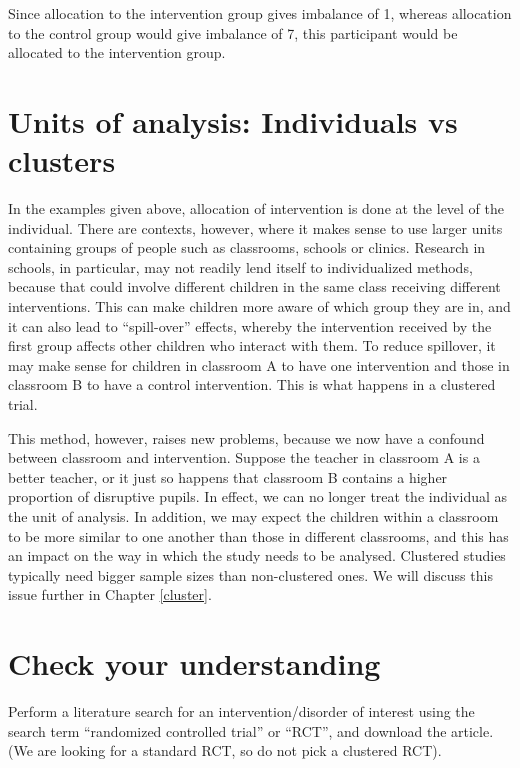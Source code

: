 \documentclass{krantz}
\begin{document}
Since allocation to the intervention group gives imbalance of 1, whereas allocation to the control group would give imbalance of 7, this participant would be allocated to the intervention group.

\hypertarget{units-of-analysis-individuals-vs-clusters}{%
\section{Units of analysis: Individuals vs clusters}\label{units-of-analysis-individuals-vs-clusters}}

In the examples given above, allocation of intervention is done at the level of the individual. There are contexts, however, where it makes sense to use larger units containing groups of people such as classrooms, schools or clinics. Research in schools, in particular, may not readily lend itself to individualized methods, because that could involve different children in the same class receiving different interventions. This can make children more aware of which group they are in, and it can also lead to ``spill-over'' effects, whereby the intervention received by the first group affects other children who interact with them. To reduce spillover, it may make sense for children in classroom A to have one intervention and those in classroom B to have a control intervention. This is what happens in a clustered trial.

This method, however, raises new problems, because we now have a confound between classroom and intervention. Suppose the teacher in classroom A is a better teacher, or it just so happens that classroom B contains a higher proportion of disruptive pupils. In effect, we can no longer treat the individual as the unit of analysis. In addition, we may expect the children within a classroom to be more similar to one another than those in different classrooms, and this has an impact on the way in which the study needs to be analysed. Clustered studies typically need bigger sample sizes than non-clustered ones. We will discuss this issue further in Chapter \ref{cluster}.

\hypertarget{check-your-understanding-6}{%
\section{Check your understanding}\label{check-your-understanding-6}}

Perform a literature search for an intervention/disorder of interest using the search term ``randomized controlled trial'' or ``RCT'', and download the article. (We are looking for a standard RCT, so do not pick a clustered RCT).
\end{document}
